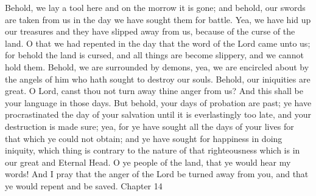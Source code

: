 Behold, we lay a tool here and on the morrow it is gone; and behold, our swords are taken from us in the day we have sought them for battle.
\bverse \iffalse Yea, we have hid up our treasures and they have slipped away from us, because of the curse of the land. \fi
Yea, we have hid up our treasures and they have slipped away from us, because of the curse of the land.
\bverse \iffalse O that we had repented in the day that the word of the Lord came unto us; for behold the land is cursed, and all things are become slippery, and we cannot hold them. \fi
O that we had repented in the day that the word of the Lord came unto us; for behold the land is cursed, and all things are become slippery, and we cannot hold them.
\bverse \iffalse Behold, we are surrounded by demons, yea, we are encircled about by the angels of him who hath sought to destroy our souls.  Behold, our iniquities are great. O Lord, canst thou not turn away thine anger from us? And this shall be your language in those days. \fi
Behold, we are surrounded by demons, yea, we are encircled about by the angels of him who hath sought to destroy our souls.  Behold, our iniquities are great. O Lord, canst thou not turn away thine anger from us? And this shall be your language in those days.
\bverse \iffalse But behold, your days of probation are past; ye have procrastinated the day of your salvation until it is everlastingly too late, and your destruction is made sure; yea, for ye have sought all the days of your lives for that which ye could not obtain; and ye have sought for happiness in doing iniquity, which thing is contrary to the nature of that righteousness which is in our great and Eternal Head. \fi
But behold, your days of probation are past; ye have procrastinated the day of your salvation until it is everlastingly too late, and your destruction is made sure; yea, for ye have sought all the days of your lives for that which ye could not obtain; and ye have sought for happiness in doing iniquity, which thing is contrary to the nature of that righteousness which is in our great and Eternal Head.
\bverse \iffalse O ye people of the land, that ye would hear my words! And I pray that the anger of the Lord be turned away from you, and that ye would repent and be saved. \fi
O ye people of the land, that ye would hear my words! And I pray that the anger of the Lord be turned away from you, and that ye would repent and be saved.
Chapter 14
\bchapter
\bverse \iffalse And now it came to pass that Samuel, the Lamanite, did prophesy a great many more things which cannot be written. \fi
